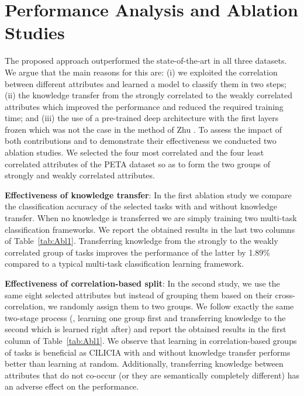 \documentclass[10pt,twocolumn,letterpaper]{article}
\begin{document}
	\section{Performance Analysis and Ablation Studies}
	The proposed approach outperformed the state-of-the-art in all three datasets. We argue that the main reasons for this are: (i) we exploited the correlation between different attributes and learned a model to classify them in two steps; (ii) the knowledge transfer from the strongly correlated to the weakly correlated attributes which improved the performance and reduced the required training time; and (iii) the use of a pre-trained deep architecture with the first layers frozen which was not the case in the method of Zhu \etal \cite{zhu2015multi}. To assess the impact of both contributions and to demonstrate their effectiveness we conducted two ablation studies. We selected the four most correlated and the four least correlated attributes of the PETA dataset so as to form the two groups of strongly and weakly correlated attributes. 
	
	\noindent\textbf{Effectiveness of knowledge transfer}: In the first ablation study we compare the classification accuracy of the selected tasks with and without knowledge transfer. When no knowledge is transferred we are simply training two multi-task classification frameworks. We report the obtained results in the last two columns of Table~\ref{tab:Abl1}. Transferring knowledge from the strongly to the weakly correlated group of tasks improves the performance of the latter by 1.89\% compared to a typical multi-task classification learning framework. 
	
	\noindent\textbf{Effectiveness of correlation-based split}: In the second study, we use the same eight selected attributes but instead of grouping them based on their cross-correlation, we randomly assign them to two groups. We follow exactly the same two-stage process (\ie, learning one group first and transferring knowledge to the second which is learned right after) and report the obtained results in the first column of Table~\ref{tab:Abl1}. We observe that learning in correlation-based groups of tasks is beneficial as CILICIA with and without knowledge transfer performs better than learning at random. Additionally, transferring knowledge between attributes that do not co-occur (or they are semantically completely different) has an adverse effect on the performance.
	
\end{document}
